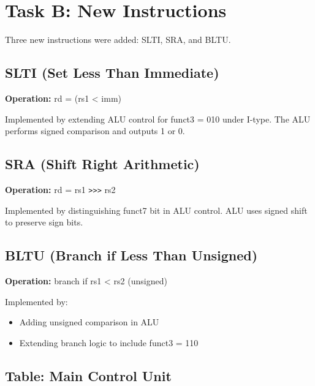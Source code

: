 \documentclass[11pt,a4paper]{article}
\begin{document}
\section{Task B: New Instructions}

Three new instructions were added: SLTI, SRA, and BLTU.

\subsection{SLTI (Set Less Than Immediate)}

\textbf{Operation:} rd = (rs1 < imm)

Implemented by extending ALU control for funct3 = 010 under I-type.
The ALU performs signed comparison and outputs 1 or 0.

\subsection{SRA (Shift Right Arithmetic)}

\textbf{Operation:} rd = rs1 \texttt{>>>} rs2

Implemented by distinguishing funct7 bit in ALU control.
ALU uses signed shift to preserve sign bits.

\subsection{BLTU (Branch if Less Than Unsigned)}

\textbf{Operation:} branch if rs1 < rs2 (unsigned)

Implemented by:
\begin{itemize}
\item Adding unsigned comparison in ALU
\item Extending branch logic to include funct3 = 110
\end{itemize}

\subsection*{Table: Main Control Unit}

\begin{table}[H]
\centering
{}
\end{table}
\end{document}
